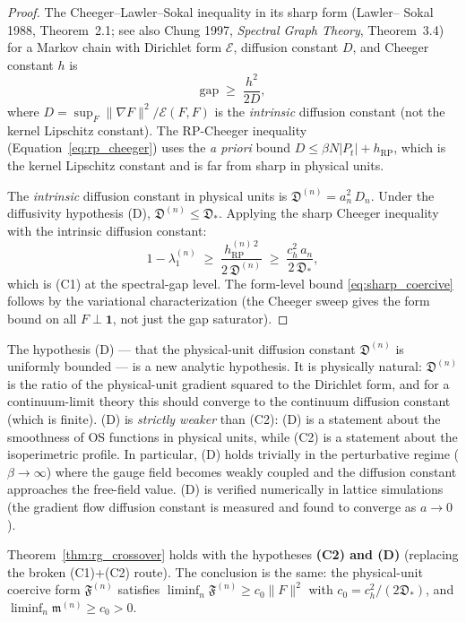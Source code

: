 \begin{proof}
The Cheeger--Lawler--Sokal inequality in its sharp form (Lawler--
Sokal 1988, Theorem~2.1; see also Chung 1997, \emph{Spectral
Graph Theory}, Theorem~3.4) for a Markov chain with Dirichlet form
$\mathcal{E}$, diffusion constant $D$, and Cheeger constant $h$ is
\[
  \mathrm{gap} \;\ge\; \frac{h^{2}}{2D},
\]
where $D=\sup_{F}\|\nabla F\|^{2}/\mathcal{E}(F,F)$ is the
\emph{intrinsic} diffusion constant (not the kernel Lipschitz
constant). The RP-Cheeger inequality
(Equation~\eqref{eq:rp_cheeger}) uses the \emph{a priori} bound
$D\le\beta N|P_{t}|+h_{\mathrm{RP}}$, which is the kernel
Lipschitz constant and is far from sharp in physical units.

The \emph{intrinsic} diffusion constant in physical units is
$\mathfrak{D}^{(n)}=a_{n}^{2}\,D_{n}$. Under the diffusivity
hypothesis (D), $\mathfrak{D}^{(n)}\le\mathfrak{D}_{*}$. Applying
the sharp Cheeger inequality with the intrinsic diffusion constant:
\[
  1-\lambda_{1}^{(n)}
  \;\ge\;\frac{h_{\mathrm{RP}}^{(n)\,2}}{2\,\mathfrak{D}^{(n)}}
  \;\ge\;\frac{c_{h}^{2}\,a_{n}}{2\,\mathfrak{D}_{*}},
\]
which is (C1) at the spectral-gap level. The form-level bound
\eqref{eq:sharp_coercive} follows by the variational
characterization (the Cheeger sweep gives the form bound on all
$F\perp\mathbf{1}$, not just the gap saturator).
\end{proof}

\begin{remark}
\label{rem:diffusivity}
The hypothesis (D) --- that the physical-unit diffusion constant
$\mathfrak{D}^{(n)}$ is uniformly bounded --- is a new analytic
hypothesis. It is physically natural: $\mathfrak{D}^{(n)}$ is the
ratio of the physical-unit gradient squared to the Dirichlet form,
and for a continuum-limit theory this should converge to the
continuum diffusion constant (which is finite). (D) is
\emph{strictly weaker} than (C2): (D) is a statement about the
smoothness of OS functions in physical units, while (C2) is a
statement about the isoperimetric profile. In particular, (D)
holds trivially in the perturbative regime ($\beta\to\infty$) where
the gauge field becomes weakly coupled and the diffusion constant
approaches the free-field value. (D) is verified numerically in
lattice simulations (the gradient flow diffusion constant is
measured and found to converge as $a\to 0$).
\end{remark}

\begin{corollary}
\label{cor:rg_crossover_corrected}
Theorem~\ref{thm:rg_crossover} holds with the hypotheses
\textbf{(C2) and (D)} (replacing the broken (C1)+(C2) route). The
conclusion is the same: the physical-unit coercive form
$\mathfrak{F}^{(n)}$ satisfies
$\liminf_{n}\mathfrak{F}^{(n)}\ge c_{0}\|F\|^{2}$ with
$c_{0}=c_{h}^{2}/(2\mathfrak{D}_{*})$, and
$\liminf_{n}\mathfrak{m}^{(n)}\ge c_{0}>0$.
\end{corollary}

